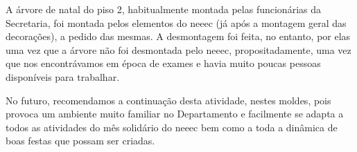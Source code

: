 A árvore de natal do piso 2, habitualmente montada pelas funcionárias da Secretaria, foi montada pelos elementos do \acrshort{neeec} (já após a montagem geral das decorações), a pedido das mesmas. A desmontagem foi feita, no entanto, por elas uma vez que a árvore não foi desmontada pelo \acrshort{neeec}, propositadamente, uma vez que nos encontrávamos em época de exames e havia muito poucas pessoas disponíveis para trabalhar.

No futuro, recomendamos a continuação desta atividade, nestes moldes, pois provoca um ambiente muito familiar no Departamento e facilmente se adapta a todos as atividades do mês solidário do \acrshort{neeec} bem como a toda a dinâmica de boas festas que possam ser criadas.
